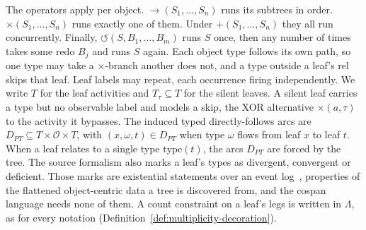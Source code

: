 The operators apply per object. $\to(S_1,\ldots,S_n)$ runs its subtrees in order.
$\times(S_1,\ldots,S_n)$ runs exactly one of them. Under $+(S_1,\ldots,S_n)$ they all run
concurrently. Finally, $\circlearrowleft(S,B_1,\ldots,B_m)$ runs $S$ once, then any number of times
takes some redo $B_j$ and runs $S$ again. Each object type follows its own path, so one type may
take a $\times$-branch another does not, and a type outside a leaf's $\mathrm{rel}$ skips that
leaf. Leaf labels may repeat, each occurrence firing independently. We write $T$ for the leaf
activities and $T_\tau\subseteq T$ for the silent leaves. A silent leaf carries a type but no
observable label and models a skip, the XOR alternative $\times(a,\tau)$ to the activity it
bypasses. The induced typed directly-follows arcs are $D_{PT}\subseteq T\times\mathcal{O}\times T$,
with $(x,\omega,t)\in D_{PT}$ when type $\omega$ flows from leaf $x$ to leaf $t$. When a leaf
relates to a single type $\mathrm{type}(t)$, the arcs $D_{PT}$ are forced by the tree. The source
formalism also marks a leaf's types as divergent, convergent or deficient. Those marks are
existential statements over an event log~\cite{vandettenDiscoveringCompactLive2024}, properties of
the flattened object-centric data a tree is discovered from, and the cospan language needs none of
them. A count constraint on a leaf's legs is written in $\Lambda$, as for every notation
(Definition~\ref{def:multiplicity-decoration}).

